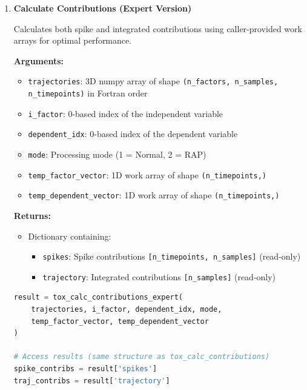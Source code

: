 \documentclass[11pt]{article}
\begin{document}
\begin{enumerate}
\begin{lstlisting}[language=Python, caption={Contributions Calculation with Internal Allocation}]
# Access results
spike_contribs = result['spikes']        # [n_timepoints, n_samples]
traj_contribs = result['trajectory']     # [n_samples]
	      \end{lstlisting}
	      
	\item \textbf{Calculate Contributions (Expert Version)}
	      
	      Calculates both spike and integrated contributions using caller-provided work
	      arrays for optimal performance.
	      
	      \textbf{Arguments:}
	      \begin{itemize}
	      	\item \texttt{trajectories}: 3D numpy array of shape \texttt{(n\_factors,
	      	      n\_samples, n\_timepoints)} in Fortran order
	      	
	      	\item \texttt{i\_factor}: 0-based index of the independent variable
	      	      
	      	\item \texttt{dependent\_idx}: 0-based index of the dependent variable
	      	      
	      	\item \texttt{mode}: Processing mode (1 = Normal, 2 = RAP)
	      	      
	      	\item \texttt{temp\_factor\_vector}: 1D work array of shape \texttt{(n\_timepoints,)}
	      	      
	      	\item \texttt{temp\_dependent\_vector}: 1D work array of shape \texttt{(n\_timepoints,)}
	      \end{itemize}
	      \textbf{Returns:}
	      \begin{itemize}
	      	\item Dictionary containing:
	      	      \begin{itemize}
	      	      	\item \texttt{spikes}: Spike contributions \texttt{[n\_timepoints, n\_samples]}
	      	      	      (read-only)
	      	      	      
	      	      	\item \texttt{trajectory}: Integrated contributions \texttt{[n\_samples]}
	      	      	      (read-only)
	      	      \end{itemize}
	      \end{itemize}
	      \begin{lstlisting}[language=Python, caption={Expert Contributions Calculation with Work Arrays}]
result = tox_calc_contributions_expert(
    trajectories, i_factor, dependent_idx, mode, 
    temp_factor_vector, temp_dependent_vector
)

# Access results (same structure as tox_calc_contributions)
spike_contribs = result['spikes']
traj_contribs = result['trajectory']
	      \end{lstlisting}
\end{enumerate}
\end{document}
